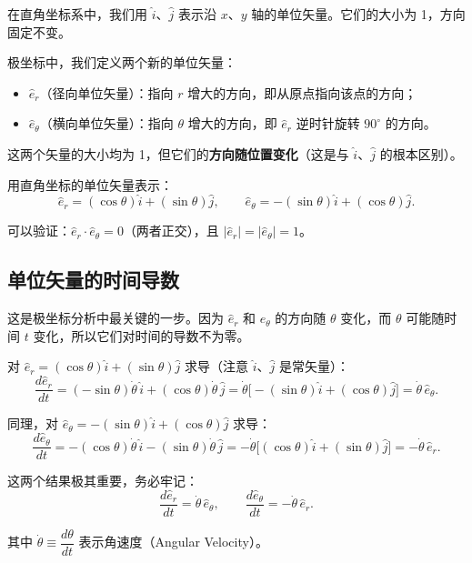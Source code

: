 \documentclass[12pt,a4paper]{article}
\begin{document}
在直角坐标系中，我们用 $\hat{i}$、$\hat{j}$ 表示沿 $x$、$y$ 轴的单位矢量。它们的大小为 1，方向固定不变。

极坐标中，我们定义两个新的单位矢量：
\begin{itemize}
  \item $\hat{e}_r$（径向单位矢量）：指向 $r$ 增大的方向，即从原点指向该点的方向；
  \item $\hat{e}_\theta$（横向单位矢量）：指向 $\theta$ 增大的方向，即 $\hat{e}_r$ 逆时针旋转 $90^\circ$ 的方向。
\end{itemize}

这两个矢量的大小均为 1，但它们的\textbf{方向随位置变化}（这是与 $\hat{i}$、$\hat{j}$ 的根本区别）。

用直角坐标的单位矢量表示：
\[
\hat{e}_r = (\cos\theta)\hat{i} + (\sin\theta)\hat{j},\qquad
\hat{e}_\theta = -(\sin\theta)\hat{i} + (\cos\theta)\hat{j}.
\]

可以验证：$\hat{e}_r \cdot \hat{e}_\theta = 0$（两者正交），且 $|\hat{e}_r| = |\hat{e}_\theta| = 1$。

\subsection{单位矢量的时间导数}

这是极坐标分析中最关键的一步。因为 $\hat{e}_r$ 和 $\hat{e}_\theta$ 的方向随 $\theta$ 变化，而 $\theta$ 可能随时间 $t$ 变化，所以它们对时间的导数不为零。

对 $\hat{e}_r = (\cos\theta)\hat{i} + (\sin\theta)\hat{j}$ 求导（注意 $\hat{i}$、$\hat{j}$ 是常矢量）：
\[
\frac{d\hat{e}_r}{dt} = (-\sin\theta)\dot{\theta}\,\hat{i} + (\cos\theta)\dot{\theta}\,\hat{j}
                      = \dot{\theta}\big[ -(\sin\theta)\hat{i} + (\cos\theta)\hat{j} \big]
                      = \dot{\theta}\,\hat{e}_\theta.
\]

同理，对 $\hat{e}_\theta = -(\sin\theta)\hat{i} + (\cos\theta)\hat{j}$ 求导：
\[
\frac{d\hat{e}_\theta}{dt} = -(\cos\theta)\dot{\theta}\,\hat{i} - (\sin\theta)\dot{\theta}\,\hat{j}
                           = -\dot{\theta}\big[ (\cos\theta)\hat{i} + (\sin\theta)\hat{j} \big]
                           = -\dot{\theta}\,\hat{e}_r.
\]

这两个结果极其重要，务必牢记：
\[
\boxed{\frac{d\hat{e}_r}{dt} = \dot{\theta}\,\hat{e}_\theta},\qquad
\boxed{\frac{d\hat{e}_\theta}{dt} = -\dot{\theta}\,\hat{e}_r}.
\]

其中 $\dot{\theta} \equiv \dfrac{d\theta}{dt}$ 表示角速度（Angular Velocity）。
\end{document}
